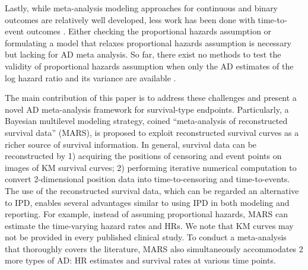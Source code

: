 \documentclass[12pt]{article}
\theoremstyle{mystyle}
\begin{document}

Lastly, while meta-analysis modeling approaches for continuous and binary outcomes are relatively well developed, less work has been done with time‐to‐event outcomes \citep{Freeman2017}.  Either checking the proportional hazards assumption or formulating a model that relaxes proportional hazards assumption is necessary but lacking for AD meta analysis.  So far, there exist no methods to test the validity of proportional hazards assumption when only the AD estimates of the log hazard ratio and its variance are available \citep{Rulli2018}. 
\fi



The main contribution of this paper is to address these challenges and present a novel AD meta-analysis framework for survival-type endpoints. 
Particularly, a Bayesian multilevel modeling strategy, coined ``meta-analysis of reconstructed survival data'' (MARS), is proposed to exploit reconstructed survival curves as a richer source of survival information.
In general, survival data can be reconstructed by 1) acquiring the positions of censoring and event points on images of KM survival curves; 2) performing iterative numerical computation to convert 2-dimensional position data into time-to-censoring and time-to-events.  The use of the reconstructed survival data, which can be regarded an alternative to IPD, enables several advantages similar to using IPD in both modeling and reporting.  For example, instead of assuming proportional hazards, MARS can estimate the time-varying hazard rates and HRs. 
We note that KM curves may not be provided in every published clinical study.  To conduct a meta-analysis that thoroughly covers the literature, MARS also simultaneously accommodates 2 more types of AD: HR estimates and survival rates at various time points. 


\end{document}
